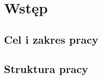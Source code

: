 
\chapter{Wstęp}\label{chap:intro}
{


    \section{Cel i zakres pracy}
    {
    }

    \section{Struktura pracy}
    {
    }
}


